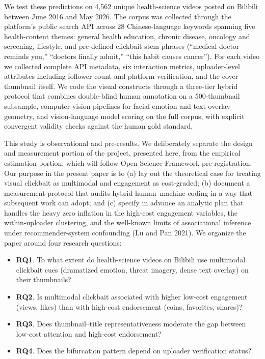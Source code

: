 \documentclass[
  12pt,
]{article}
\providecommand{\tightlist}{%
  \setlength{\itemsep}{0pt}\setlength{\parskip}{0pt}}
\begin{document}
We test these predictions on 4,562 unique health-science videos posted
on Bilibili between June 2016 and May 2026. The corpus was collected
through the platform's public search API across 28 Chinese-language
keywords spanning five health-content themes: general health education,
chronic disease, oncology and screening, lifestyle, and pre-defined
clickbait stem phrases (``medical doctor reminds you,'' ``doctors
finally admit,'' ``this habit causes cancer''). For each video we
collected complete API metadata, six interaction metrics, uploader-level
attributes including follower count and platform verification, and the
cover thumbnail itself. We code the visual constructs through a
three-tier hybrid protocol that combines double-blind human annotation
on a 500-thumbnail subsample, computer-vision pipelines for facial
emotion and text-overlay geometry, and vision-language model scoring on
the full corpus, with explicit convergent validity checks against the
human gold standard.

This study is observational and pre-results. We deliberately separate
the design and measurement portion of the project, presented here, from
the empirical estimation portion, which will follow Open Science
Framework pre-registration. Our purpose in the present paper is to (a)
lay out the theoretical case for treating visual clickbait as multimodal
and engagement as cost-graded; (b) document a measurement protocol that
audits hybrid human--machine coding in a way that subsequent work can
adopt; and (c) specify in advance an analytic plan that handles the
heavy zero inflation in the high-cost engagement variables, the
within-uploader clustering, and the well-known limits of associational
inference under recommender-system confounding (Lu and Pan 2021). We
organize the paper around four research questions:

\begin{itemize}
\tightlist
\item
  \textbf{RQ1}. To what extent do health-science videos on Bilibili use
  multimodal clickbait cues (dramatized emotion, threat imagery, dense
  text overlay) on their thumbnails?
\item
  \textbf{RQ2}. Is multimodal clickbait associated with higher low-cost
  engagement (views, likes) than with high-cost endorsement (coins,
  favorites, shares)?
\item
  \textbf{RQ3}. Does thumbnail--title representativeness moderate the
  gap between low-cost attention and high-cost endorsement?
\item
  \textbf{RQ4}. Does the bifurcation pattern depend on uploader
  verification status?
\end{itemize}
\end{document}

